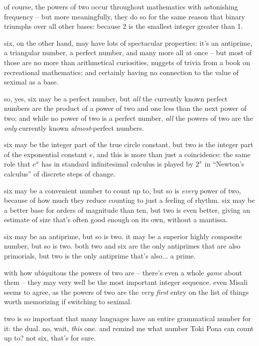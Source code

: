 \documentclass[../best.tex]{subfiles}
\begin{document}
of course, the powers of two occur throughout mathematics with astonishing frequency\myfootnote{} -- but more meaningfully, they do so for the same reason that binary triumphs over all other bases: because 2 is the smallest integer greater than 1.

six, on the other hand, may have lots of spectacular properties: it's an antiprime, a triangular number, a perfect number, and many more all at once -- but most of those are no more than arithmetical curiosities, nuggets of trivia from a book on recreational mathematics; and certainly having no connection to the value of seximal as a base.

so, yes, six may be a perfect number, but \emph{all} the currently known perfect numbers are the product of a power of two and one less than the next power of two; and while no power of two is a perfect number, \emph{all} the powers of two are the \emph{only} currently known \emph{almost}-perfect numbers.

six may be the integer part of the true circle constant.\myfootnote{} but two is the integer part of the exponential constant $e$, and this is more than just a coincidence: the same role that $e^x$ has in standard infinitesimal calculus is played by $2^x$ in ``Newton's calculus'' of discrete steps of change.\myfootnote{}

six may be a convenient number to count up to, but so is \emph{every} power of two, because of how much they reduce counting to just a feeling of rhythm. six may be a better base for orders of magnitude than ten, but two is even better, giving an estimate of size that's often good enough on its own, without a mantissa.

six may be an antiprime, but so is two. it may be a superior highly composite number, but so is two. both two and six are the only antiprimes that are also primorials, but two is the only antiprime that's also... a prime.

with how ubiquitous the powers of two are -- there's even a whole \emph{game} about them\myfootnote{} -- they may very well be the most important integer sequence. even Misali seems to agree, as the powers of two are the \emph{very first} entry on the list of things worth memorizing if switching to seximal.\myfootnote{}

two is so important that many languages have an entire grammatical number for it: the dual. no, wait, \emph{this} one.\myfootnote{} and remind me what number Toki Pona can count up to? not six, that's for sure.
\end{document}
